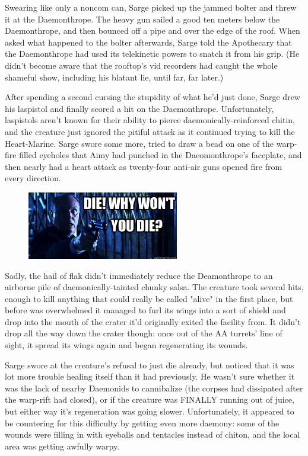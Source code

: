 Swearing like only a noncom can, Sarge picked up the jammed bolter and threw it at the Daemonthrope. 
The heavy gun sailed a good ten meters below the Daemonthrope, and then bounced off a pipe and over the edge of the roof. 
When asked what happened to the bolter afterwards, Sarge told the Apothecary that the Daemonthrope had used its telekinetic powers to snatch it from his grip. 
(He didn't become aware that the rooftop's vid recorders had caught the whole shameful show, including his blatant lie, until far, far later.)

After spending a second cursing the stupidity of what he'd just done, Sarge drew his laspistol and finally scored a hit on the Daemonthrope. 
Unfortunately, laspistols aren't known for their ability to pierce daemonically-reinforced chitin, and the creature just ignored the pitiful attack as it continued trying to kill the Heart-Marine. 
Sarge swore some more, tried to draw a bead on one of the warp-fire filled eyeholes that Aimy had punched in the Daeomonthrope's faceplate, and then nearly had a heart attack as twenty-four anti-air guns opened fire from every direction.

\begin{figure}
	\begin{center}
		\includegraphics[width=\figwidth]{pics/16/56.png}
	\end{center}
\end{figure}
Sadly, the hail of flak didn't immediately reduce the Deamonthrope to an airborne pile of daemonically-tainted chunky salsa. 
The creature took several hits, enough to kill anything that could really be called "alive" in the first place, but before was overwhelmed it managed to furl its wings into a sort of shield and drop into the mouth of the crater it'd originally exited the facility from. 
It didn't drop all the way down the crater though: 
once out of the AA turrets' line of sight, it spread its wings again and began regenerating its wounds.

Sarge swore at the creature's refusal to just die already, but noticed that it was lot more trouble healing itself than it had previously. 
He wasn't sure whether it was the lack of nearby Daemonids to cannibalize (the corpses had dissipated after the warp-rift had closed), or if the creature was FINALLY running out of juice, but either way it's regeneration was going slower. 
Unfortunately, it appeared to be countering for this difficulty by getting even more daemony: 
some of the wounds were filling in with eyeballs and tentacles instead of chiton, and the local area was getting awfully warpy.

